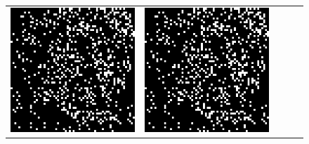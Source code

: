 \begin{figure}
\begin{tabular}{c c c c c}
		\includegraphics[width=\tilewidth,interpolate=false]{media/chp2/associative_memory/hopfield/04_01_noise_scaled_crushed.png}&%
		\includegraphics[width=\tilewidth,interpolate=false]{media/chp2/associative_memory/hopfield/04_02_activation_scaled_crushed.png}&%

\end{tabular}
\end{figure}

